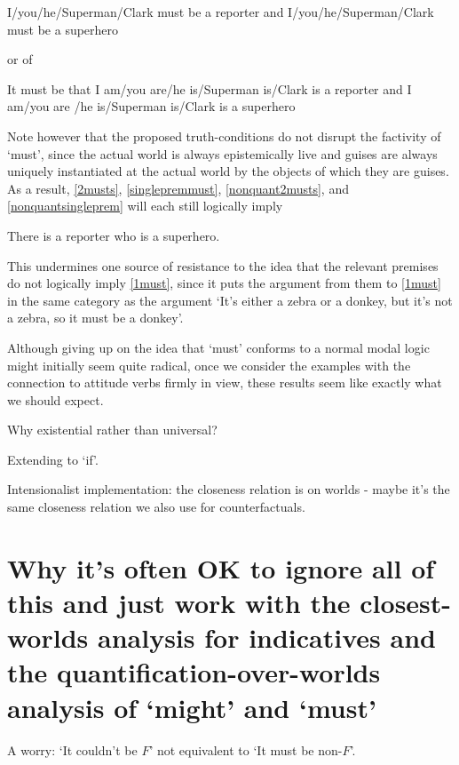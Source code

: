 \documentclass[If.tex]{subfiles}
\begin{document}
\begin{prop}
    \nitem \label{nonquant2musts}
    I/you/he/Superman/Clark must be a reporter and I/you/he/Superman/Clark must be a superhero
\end{prop}
or of
\begin{prop}
    \nitem \label{nonquantsingleprem}
    It must be that I am/you are/he is/Superman is/Clark is a reporter and I am/you are /he is/Superman is/Clark is a superhero
\end{prop}
Note however that the proposed truth-conditions do not disrupt the factivity of ‘must’, since the actual world is always epistemically live and guises are always uniquely instantiated at the actual world by the objects of which they are guises.  As a result, \ref{2musts}, \ref{singlepremmust}, \ref{nonquant2musts}, and \ref{nonquantsingleprem} will each still logically imply
\begin{prop}
    \nitem
    There is a reporter who is a superhero.
\end{prop}
This undermines one source of resistance to the idea that the relevant premises do not logically imply \ref{1must}, since it puts the argument from them to \ref{1must} in the same category as the argument ‘It's either a zebra or a donkey, but it's not a zebra, so it must be a donkey’.  

Although giving up on the idea that ‘must’ conforms to a normal modal logic might initially seem quite radical, once we consider the examples with the connection to attitude verbs firmly in view, these results seem like exactly what we should expect.  










Why existential rather than universal?  

Extending to ‘if’.  

Intensionalist implementation: the closeness relation is on worlds - maybe it's the same closeness relation we also use for counterfactuals.  

\section{Why it's often OK to ignore all of this and just work with the closest-worlds analysis for indicatives and the quantification-over-worlds analysis of ‘might’ and ‘must’}

A worry: ‘It couldn't be $F$’ not equivalent to ‘It must be non-$F$’.
\end{document}
